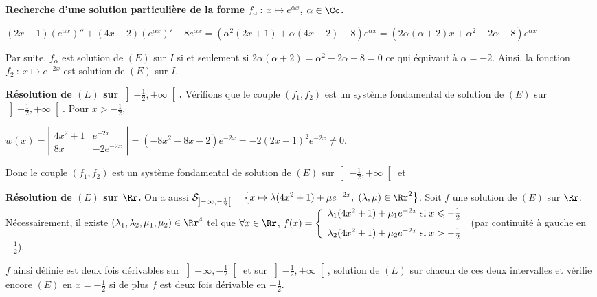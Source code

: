 {\begin{enumerate}
{\textbf{Recherche d'une solution particulière de la forme $f_\alpha~:~x\mapsto e^{\alpha x}$, $\alpha\in\Cc$.}

\begin{center}
$(2x+1)(e^{\alpha x})''+(4x-2)(e^{\alpha x})'-8e^{\alpha x}=\left(\alpha^2(2x+1)+\alpha(4x-2)-8\right)e^{\alpha x}=\left(2\alpha(\alpha+2)x+\alpha^2-2\alpha-8\right)e^{\alpha x}$
\end{center}

Par suite, $f_{\alpha}$ est solution de $(E)$ sur $I$ si et seulement si $2\alpha(\alpha+2)=\alpha^2-2\alpha-8=0$ ce qui équivaut à $\alpha=-2$. Ainsi, la fonction $f_2~:~x\mapsto e^{-2x}$ est solution de $(E)$ sur $I$.

\textbf{Résolution de $(E)$ sur $\left]- \frac{1}{2},+\infty\right[$.} Vérifions que le couple $(f_1,f_2)$ est un système fondamental de solution de $(E)$ sur $\left]- \frac{1}{2},+\infty\right[$. Pour $x>- \frac{1}{2}$,

\begin{center}
$w(x)=\left|
\begin{array}{cc}
4x^2+1&e^{-2x}\\
8x&-2e^{-2x}
\end{array}
\right|
=(-8x^2-8x-2)e^{-2x}=-2(2x+1)^2e^{-2x}\neq0$.
\end{center}

Donc le couple $(f_1,f_2)$ est un système fondamental de solution de $(E)$ sur $\left]- \frac{1}{2},+\infty\right[$ et

\begin{center}
\fbox{
$\mathcal{S}_{\left]-\frac{1}{2},+\infty\right[}=\left\{x\mapsto\lambda(4x^2+1)+\mu e^{-2x},\;(\lambda,\mu)\in\Rr^2\right\}$.
}
\end{center}

\textbf{Résolution de $(E)$ sur $\Rr$.} On a aussi $\mathcal{S}_{\left]-\infty,-\frac{1}{2}\right[}=\left\{x\mapsto\lambda(4x^2+1)+\mu e^{-2x},\;(\lambda,\mu)\in\Rr^2\right\}$. Soit $f$ une solution de $(E)$ sur $\Rr$. Nécessairement, il existe $(\lambda_1,\lambda_2,\mu_1,\mu_2)\in\Rr^4$ tel que $\forall x\in\Rr$, $f(x)=\left\{
\begin{array}{l}
\lambda_1(4x^2+1)+\mu_1 e^{-2x}\;\text{si}\;x\leqslant- \frac{1}{2}\\
\rule{0mm}{6mm}\lambda_2(4x^2+1)+\mu_2 e^{-2x}\;\text{si}\;x>- \frac{1}{2}
\end{array}
\right.$ (par continuité à gauche en $- \frac{1}{2}$).

$f$ ainsi définie est deux fois dérivables sur $\left]-\infty,- \frac{1}{2}\right[$ et sur $\left]- \frac{1}{2},+\infty\right[$, solution de $(E)$ sur chacun de ces deux intervalles et vérifie encore $(E)$ en $x=- \frac{1}{2}$ si de plus $f$ est deux fois dérivable en $- \frac{1}{2}$. 

}
\end{enumerate}}
